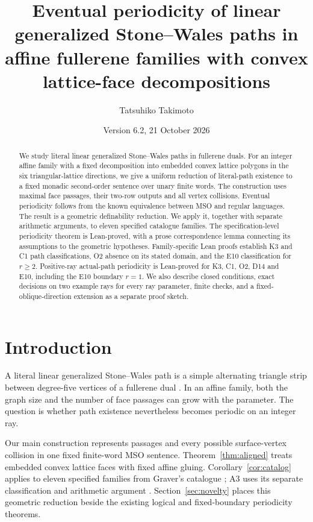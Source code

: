 \documentclass[11pt]{amsart}
\title[Affine fullerene families and eventual periodicity]{Eventual periodicity of linear generalized Stone--Wales paths in affine fullerene families with convex lattice-face decompositions}
\author{Tatsuhiko Takimoto}
\date{Version 6.2, 21 October 2026}
\theoremstyle{definition}\newtheorem{definition}{Definition}
\begin{document}
\begin{abstract}
We study literal linear generalized Stone--Wales paths in fullerene
duals. For an integer affine family with a fixed decomposition into
embedded convex lattice polygons in the six triangular-lattice
directions, we give a uniform reduction of literal-path existence to a
fixed monadic second-order sentence over unary finite words. The
construction uses maximal face passages, their two-row outputs and all
vertex collisions. Eventual periodicity follows from the known equivalence
between MSO and regular languages. The result is a geometric definability
reduction. We apply it, together with separate arithmetic arguments,
to eleven specified catalogue families. The specification-level
periodicity theorem is Lean-proved, with a prose correspondence lemma
connecting its assumptions to the geometric hypotheses. Family-specific
Lean proofs establish K3 and C1 path classifications, O2 absence on
its stated domain, and the E10 classification for $r\ge2$.
Positive-ray actual-path periodicity is Lean-proved for K3, C1, O2,
D14 and E10, including the E10 boundary $r=1$. We also describe closed conditions, exact decisions on
two example rays for every ray parameter, finite checks, and a
fixed-oblique-direction extension as a separate proof sketch.
\end{abstract}
\maketitle

\section{Introduction}
A literal linear generalized Stone--Wales path is a simple alternating
triangle strip between degree-five vertices of a fullerene dual
\cite{BBS}. In an affine family, both the graph size and the number of
face passages can grow with the parameter. The question is whether
path existence nevertheless becomes periodic on an integer ray.

Our main construction represents passages and every possible
surface-vertex collision in one fixed finite-word MSO sentence.
Theorem~\ref{thm:aligned} treats embedded convex lattice faces with
fixed affine gluing. Corollary~\ref{cor:catalog} applies to eleven
specified families from Graver's catalogue \cite{Graver}; A3 uses its
separate classification and arithmetic argument \cite{A3}.
Section~\ref{sec:novelty} places this geometric reduction beside the
existing logical and fixed-boundary periodicity theorems.
\end{document}
